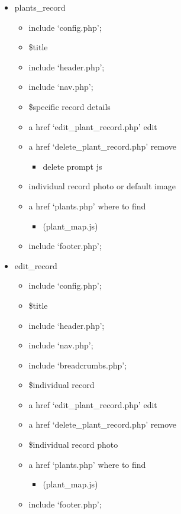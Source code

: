 \begin{itemize}
		\item plants\_record
		\begin{itemize}
			\item include `config.php';
			\item \$title
			\item include `header.php';
			\item include `nav.php';
			\item \$specific record details
			\item a href `edit\_plant\_record.php' edit
			\item a href `delete\_plant\_record.php' remove
			\begin{itemize}
				\item delete prompt js
			\end{itemize}
			\item individual record photo or default image
			\item a href `plants.php' where to find
			\begin{itemize}
				\item (plant\_map.js)
			\end{itemize}
			\item include `footer.php';
		\end{itemize}		
			
		\item edit\_record
		\begin{itemize}
			\item include `config.php';
			\item \$title
			\item include `header.php';
			\item include `nav.php';
			\item include `breadcrumbs.php';
			\item \$individual record
			\item a href `edit\_plant\_record.php' edit
			\item a href `delete\_plant\_record.php' remove
			\item \$individual record photo
			\item a href `plants.php' where to find
			\begin{itemize}
				\item (plant\_map.js)
			\end{itemize}
			\item include `footer.php';
		\end{itemize}
	\end{itemize}
	
